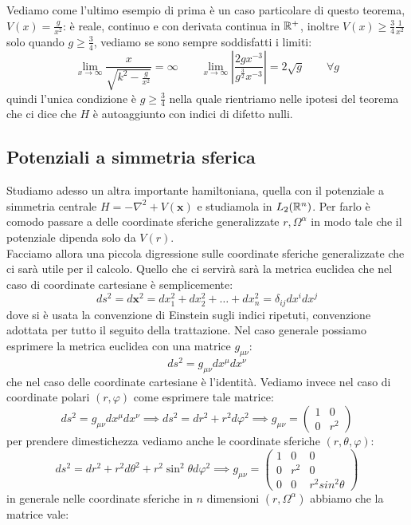 Vediamo come l'ultimo esempio di prima è un caso particolare di questo teorema, $V(x) = \frac{g}{x^2}$: è reale, continuo e con derivata continua in $\mathbb{R}^+$, inoltre $V(x)\geq \frac{3}{4}\frac{1}{x^2}$ solo quando $g\geq \frac{3}{4}$, vediamo se sono sempre soddisfatti i limiti:
\[\lim_{x\to\infty}\frac{x}{\sqrt{k^2-\frac{g}{x^2}}} = \infty \qquad  \lim_{x\to \infty} \left|\frac{2gx^{-3}}{g^{\frac{3}{2}}x^{-3} }\right| = 2\sqrt{g}\qquad \forall g \]
quindi l'unica condizione è $g\geq \frac{3}{4}$ nella quale rientriamo nelle ipotesi del teorema che ci dice che $H$ è autoaggiunto con indici di difetto nulli.\\
\subsection{Potenziali a simmetria sferica}
Studiamo adesso un altra importante hamiltoniana, quella con il potenziale a simmetria centrale $H = -\nabla^2 + V(\mathbf{x})$ e studiamola in $L_2(\mathbb{R}^n)$. Per farlo è comodo passare a delle coordinate sferiche generalizzate $r,\Omega^\alpha$ in modo tale che il potenziale dipenda solo da $V(r)$.\\
Facciamo allora una piccola digressione sulle coordinate sferiche generalizzate che ci sarà utile per il calcolo. Quello che ci servirà sarà la metrica euclidea che nel caso di coordinate cartesiane è semplicemente:
\[ds^2  =d\mathbf{x}^2 = dx_1^2 + dx_2^2 +\dots + dx_n^2 = \delta_{ij}dx^idx^j\]
dove si è usata la convenzione di Einstein sugli indici ripetuti, convenzione adottata per tutto il seguito della trattazione. Nel caso generale possiamo esprimere la metrica euclidea con una matrice $g_{\mu\nu}$:
\[ds^2 = g_{\mu\nu} dx^\mu dx^\nu\]
che nel caso delle coordinate cartesiane è l'identità. Vediamo invece nel caso di coordinate polari $(r,\varphi)$ come esprimere tale matrice:
\[ds^2 = g_{\mu\nu} dx^\mu dx^\nu \implies ds^2 = dr^2+r^2d\varphi^2 \implies g_{\mu\nu} = \begin{pmatrix}
  1 & 0  \\
  0 & r^2
 \end{pmatrix} \]
per prendere dimestichezza vediamo anche le coordinate sferiche $(r,\theta,\varphi)$:
\[ds^2 = dr^2+r^2d\theta^2 +r^2\sin^2\theta d\varphi^2\implies g_{\mu\nu} = \begin{pmatrix}
  1 & 0 & 0 \\
  0 &r^2 & 0\\
  0 & 0 & r^2sin^2\theta
 \end{pmatrix}\]
in generale nelle coordinate sferiche in $n$ dimensioni $(r,\Omega^\alpha)$ abbiamo che la matrice vale:
